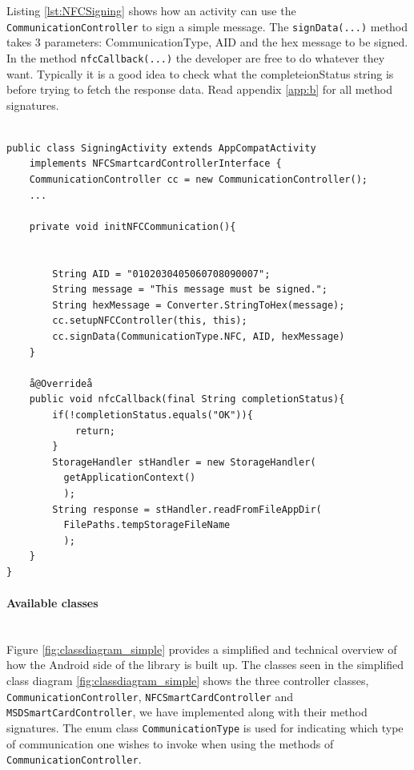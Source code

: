 Listing \ref{lst:NFCSigning} shows how an activity can use the \texttt{CommunicationController} to sign a simple message. The \texttt{signData(...)} method takes 3 parameters: CommunicationType, AID and the hex message to be signed. In the method \texttt{nfcCallback(...)} the developer are free to do whatever they want. Typically it is a good idea to check what the completeionStatus string is before trying to fetch the response data. Read appendix \ref{app:b} for all method signatures.

\begin{lstlisting}[caption=Java code example showing how to send sign a message using a NFC smart card., label=lst:NFCSigning,escapechar=å]

public class SigningActivity extends AppCompatActivity
    implements NFCSmartcardControllerInterface {
    CommunicationController cc = new CommunicationController();
    ...

    private void initNFCCommunication(){


        String AID = "0102030405060708090007";
        String message = "This message must be signed.";
        String hexMessage = Converter.StringToHex(message);
        cc.setupNFCController(this, this);
        cc.signData(CommunicationType.NFC, AID, hexMessage)
    }

    å@Overrideå
    public void nfcCallback(final String completionStatus){
        if(!completionStatus.equals("OK")){
            return;
        }
        StorageHandler stHandler = new StorageHandler(
          getApplicationContext()
          );
        String response = stHandler.readFromFileAppDir(
          FilePaths.tempStorageFileName
          );
    }
}

\end{lstlisting}

\paragraph{Available classes}\mbox{}\\
Figure \ref{fig:classdiagram_simple} provides a simplified and technical overview of how the Android side of the library is built up. The classes seen in the simplified class diagram \ref{fig:classdiagram_simple} shows the three controller classes, \texttt{CommunicationController}, \texttt{NFCSmartCardController} and \texttt{MSDSmartCardController}, we have implemented along with their method signatures. The enum class \texttt{CommunicationType} is used for indicating which type of communication one wishes to invoke when using the methods of \texttt{CommunicationController}.

